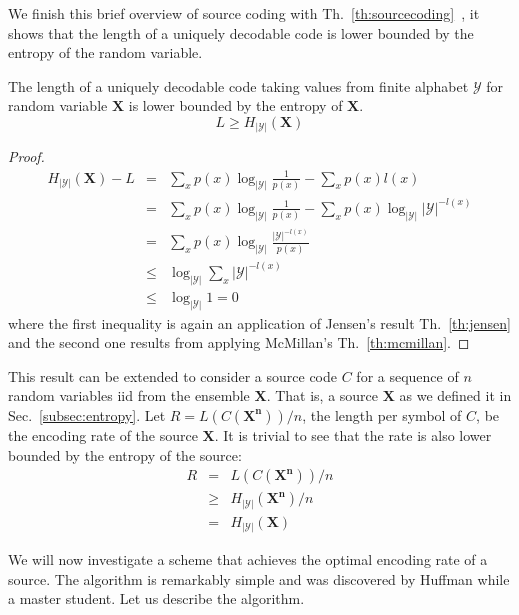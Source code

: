 We finish this brief overview of source coding with Th.~\ref{th:sourcecoding}~\cite{Cover_91}, it shows that the length  of a uniquely decodable code is lower bounded by the entropy of the random variable.
\begin{theorem}
\label{th:sourcecoding}
The length of a uniquely decodable code taking values from finite alphabet $\mathcal{Y}$ for random variable $\mathbf{X}$ is lower bounded by the entropy of $\mathbf{X}$.
\begin{equation*}
L\geq H_{|\mathcal{Y}|}(\mathbf{X})
\end{equation*}
\end{theorem}
\begin{proof}
\begin{eqnarray}
H_{|\mathcal{Y}|}(\mathbf{X}) - L &=& \sum_{x} p(x) \log_{|\mathcal{Y}|} \frac{1}{p(x)} - \sum_{x}p(x)l(x) \nonumber \\
                                      &=& \sum_{x} p(x) \log_{|\mathcal{Y}|} \frac{1}{p(x)} - \sum_{x} p(x)  \log_{|\mathcal{Y}|} |\mathcal{Y}|^{-l(x)} \nonumber \\
                                      &=& \sum_{x} p(x) \log_{|\mathcal{Y}|} \frac{|\mathcal{Y}|^{-l(x)} }{p(x)} \nonumber \\
                                      &\leq & \log_{|\mathcal{Y}|} \sum_{x} |\mathcal{Y}|^{-l(x)} \nonumber \\
                                      &\leq & \log_{|\mathcal{Y}|} 1 = 0
\end{eqnarray}
\noindent where the first inequality is again an application of Jensen's result Th.~\ref{th:jensen} and the second one results from applying McMillan's Th.~\ref{th:mcmillan}.
\end{proof}
This result can be extended to consider a source code $C$ for a sequence of $n$ random variables {iid} from the ensemble $\mathbf{X}$. That is, a source  $\mathbf{X}$ as we defined it in Sec.~\ref{subsec:entropy}. Let $R=L(C(\mathbf {X^n}))/n$, the length per symbol of $C$, be the encoding rate of the source $\mathbf{X}$. It is trivial to see that the rate is also lower bounded by the entropy of the source: \begin{eqnarray} R &=& L(C(\mathbf {X^n}))/n \nonumber\\
  &\geq& H_{|\mathcal{Y}|}(\mathbf{X^n})/n \nonumber\\
 &=& H_{|\mathcal{Y}|}(\mathbf{X})
\end{eqnarray}

We will now investigate a scheme that achieves the optimal encoding rate of a source. The algorithm is remarkably simple and was discovered by Huffman \cite{} while a master student. Let us describe the algorithm.

